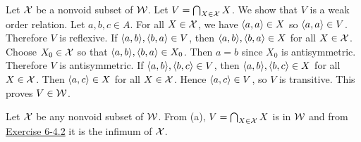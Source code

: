 \begin{solution}
\begin{enumalpha}
    \item Let $\mathcal{X}$ be a nonvoid subset of $\mathcal{W}$. Let $V=\bigcap_{X\in\mathcal{X}}X$. We show that $V$
    is a weak order relation. Let $a,b,c\in A$.
    For all $X\in\mathcal{X}$, we have $\left\langle a,a\right\rangle\in X$ so $\left\langle a,a\right\rangle\in V$. Therefore $V$ is reflexive.
    If $\aprn{a,b},\aprn{b,a}\in V$, then $\aprn{a,b},\aprn{b,a}\in X$ for all $X\in\mathcal{X}$. Choose
    $X_0\in\mathcal{X}$ so that $\aprn{a,b},\aprn{b,a}\in X_0$. Then $a=b$ since $X_0$ is antisymmetric.
    Therefore $V$ is antisymmetric.
    If $\aprn{a,b},\aprn{b,c}\in V$, then $\aprn{a,b},\aprn{b,c}\in X$ for all $X\in\mathcal{X}$.
    Then $\left\langle a,c\right\rangle\in X$ for all $X\in\mathcal{X}$. Hence $\left\langle a,c\right\rangle\in V$, so $V$ is transitive.
    This proves $V\in\mathcal{W}$.

    \item Let $\mathcal{X}$ be any nonvoid subset of $\mathcal{W}$. From (a), $V=\bigcap_{X\in\mathcal{X}}X$ is in $\mathcal{W}$
    and from \hyperref[ex:6-4.2]{Exercise 6-4.2} it is the infimum of $\mathcal{X}$.


\end{enumalpha}
\end{solution}

